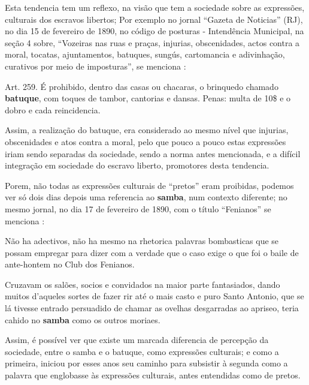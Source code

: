 Esta tendencia tem um reflexo, na visão que tem a sociedade sobre as expressões,
culturais dos escravos libertos; Por exemplo no jornal ``Gazeta de Noticias'' (RJ), 
no dia 15 de fevereiro de 1890,
no código de posturas - Intendência Municipal, 
na seção 4 sobre, 
``Vozeiras nas ruas e praças, injurias, obscenidades, 
actos contra a moral, tocatas, ajuntamentos, batuques, sungús, cartomancia e adivinhação,
curativos por meio de imposturas'', se menciona \cite[pp. 4]{batuqueperiodicogazetanoticias}:
\begin{citando}%
Art. 259. É prohibido, dentro das casas ou chacaras, o brinquedo chamado \textbf{batuque},
com toques de tambor, cantorias e dansas. Penas: multa de 10\$ e o dobro e cada reincidencia.
\end{citando}
Assim, a realização do batuque, era considerado ao mesmo nível que injurias, 
obscenidades e atos contra a moral, 
pelo que pouco a pouco estas expressões iriam sendo separadas da sociedade,
sendo a norma antes mencionada, e a difícil integração em sociedade do escravo liberto, 
promotores desta tendencia. 

Porem, não todas as expressões culturais de ``pretos'' eram proibidas,
podemos ver só dois dias depois uma referencia ao \textbf{samba}, num contexto diferente; 
no mesmo jornal, 
no dia 17 de fevereiro de 1890, com o título ``Fenianos''
se menciona \cite[pp. 1]{batuqueperiodicogazetanoticias2}:
\begin{citando}%
Não ha adectivos, não ha mesmo na 
rhetorica palavras bombasticas que se 
possam empregar para dizer com a
verdade que o caso exige o que foi o baile
de ante-hontem no Club dos Fenianos.

Cruzavam os salões, socios e convidados
na maior parte fantasiados, dando
muitos d'aqueles sortes de fazer rir até
o mais casto e puro Santo Antonio, que se
lá tivesse entrado persuadido de chamar
as ovelhas desgarradas ao apriseo, teria
cahido no \textbf{samba} como os outros moriaes.
\end{citando}%
Assim, é possível ver que existe um marcada diferencia de percepção da sociedade, entre o samba e o batuque,
como expressões culturais; e como a primeira, 
iniciou por esses anos seu caminho para subsistir à segunda como a palavra que englobasse às
expressões culturais, antes entendidas como de pretos. 




